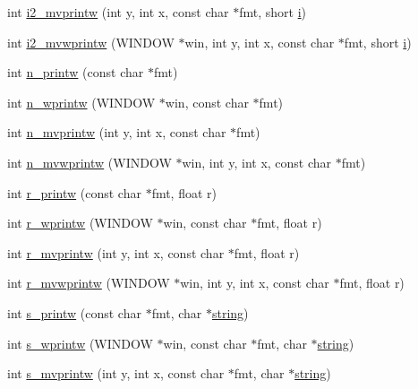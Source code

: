 \begin{DoxyCompactItemize}
\item 
int \hyperlink{C-macros_8c_a32e22b11dad68fa76c882dc89f0997f1}{i2\+\_\+mvprintw} (int y, int x, const char $\ast$fmt, short \hyperlink{intro__blas1_83_8txt_a8ba82a50c0c2c12d5f6a77f7e4651c0b}{i})
\item 
int \hyperlink{C-macros_8c_a880d70f3a8db453d86b23072715762cc}{i2\+\_\+mvwprintw} (W\+I\+N\+D\+OW $\ast$win, int y, int x, const char $\ast$fmt, short \hyperlink{intro__blas1_83_8txt_a8ba82a50c0c2c12d5f6a77f7e4651c0b}{i})
\item 
int \hyperlink{C-macros_8c_a11be0961dcb0e1af9a31aacb25f54116}{n\+\_\+printw} (const char $\ast$fmt)
\item 
int \hyperlink{C-macros_8c_aba52f28e4d247225cd79e21121b88655}{n\+\_\+wprintw} (W\+I\+N\+D\+OW $\ast$win, const char $\ast$fmt)
\item 
int \hyperlink{C-macros_8c_a46f0d46efcc85de74c517a5a30d5bf8c}{n\+\_\+mvprintw} (int y, int x, const char $\ast$fmt)
\item 
int \hyperlink{C-macros_8c_a84bbf8649db5247fc4d8f2d7fe3d22a0}{n\+\_\+mvwprintw} (W\+I\+N\+D\+OW $\ast$win, int y, int x, const char $\ast$fmt)
\item 
int \hyperlink{C-macros_8c_af5706198a4ac8d519c30824899cd04eb}{r\+\_\+printw} (const char $\ast$fmt, float r)
\item 
int \hyperlink{C-macros_8c_a6eb29a28c7477bd1f35254a66f43a4c7}{r\+\_\+wprintw} (W\+I\+N\+D\+OW $\ast$win, const char $\ast$fmt, float r)
\item 
int \hyperlink{C-macros_8c_ad0708b8c6acaba96f40a85f691012abf}{r\+\_\+mvprintw} (int y, int x, const char $\ast$fmt, float r)
\item 
int \hyperlink{C-macros_8c_aee7cd6844203dd1d2b386c1a42fb97bb}{r\+\_\+mvwprintw} (W\+I\+N\+D\+OW $\ast$win, int y, int x, const char $\ast$fmt, float r)
\item 
int \hyperlink{C-macros_8c_a952575ee46d2e04849c57062c2cb769e}{s\+\_\+printw} (const char $\ast$fmt, char $\ast$\hyperlink{what__overview_81_8txt_a7d189cc480786c3c65688ced463aedcb}{string})
\item 
int \hyperlink{C-macros_8c_a90e6df6fa68a7a58b21a763fc85a21ff}{s\+\_\+wprintw} (W\+I\+N\+D\+OW $\ast$win, const char $\ast$fmt, char $\ast$\hyperlink{what__overview_81_8txt_a7d189cc480786c3c65688ced463aedcb}{string})
\item 
int \hyperlink{C-macros_8c_a9b49cfc267a4953f8983e6e50aa43aaa}{s\+\_\+mvprintw} (int y, int x, const char $\ast$fmt, char $\ast$\hyperlink{what__overview_81_8txt_a7d189cc480786c3c65688ced463aedcb}{string})

\end{DoxyCompactItemize}
